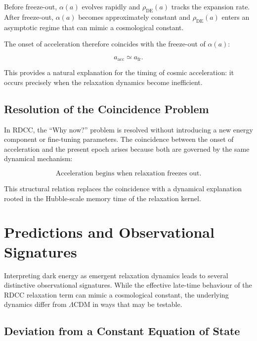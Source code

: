 \documentclass[11pt,a4paper]{article}
\newcommand{\alphaR}{\alpha}
\begin{document}
Before freeze-out, $\alphaR(a)$ evolves rapidly and $\rho_{\mathrm{DE}}(a)$
tracks the expansion rate. After freeze-out, $\alphaR(a)$ becomes approximately
constant and $\rho_{\mathrm{DE}}(a)$ enters an asymptotic regime that can mimic
a cosmological constant.

The onset of acceleration therefore coincides with the freeze-out of
$\alphaR(a)$:


\[
a_{\mathrm{acc}} \simeq a_{\mathrm{fr}}.
\]


This provides a natural explanation for the timing of cosmic acceleration: it
occurs precisely when the relaxation dynamics become inefficient.

\subsection{Resolution of the Coincidence Problem}

In RDCC, the ``Why now?'' problem is resolved without introducing a new energy
component or fine-tuning parameters. The coincidence between the onset of
acceleration and the present epoch arises because both are governed by the same
dynamical mechanism:


\[
\text{Acceleration begins when relaxation freezes out.}
\]


This structural relation replaces the coincidence with a dynamical explanation
rooted in the Hubble-scale memory time of the relaxation kernel.




\section{Predictions and Observational Signatures}

Interpreting dark energy as emergent relaxation dynamics leads to several
distinctive observational signatures. While the effective late-time behaviour of
the RDCC relaxation term can mimic a cosmological constant, the underlying
dynamics differ from $\Lambda$CDM in ways that may be testable.

\subsection{Deviation from a Constant Equation of State}
\end{document}
